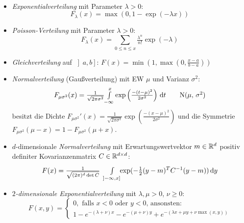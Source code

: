 \documentclass{cheat-sheet}
\begin{document}
\begin{defn}\mbox{}\\
  \begin{itemize}
    \item \emph{Exponentialverteilung} mit Parameter $\lambda > 0$:
    \[ F_{\lambda}(x) = \max(0, 1 - \exp(- \lambda x)) \tag*{Exp($\lambda$)} \]
    \item \emph{Poisson-Verteilung} mit Parameter $\lambda > 0$:
    \[ F_{\lambda}(x) = \sum_{0 \leq n \leq x} \tfrac{\lambda^n}{n!} \exp(-\lambda) \tag*{Poi($\lambda$)} \]
    \item \emph{Gleichverteilung} auf $\left] a, b \right]$: $F(x) = \min(1, \max(0, \tfrac{x - a}{b - a}))$
    \item \emph{Normalverteilung} (Gaußverteilung) mit EW $\mu$ und Varianz $\sigma^2$:
    \[ F_{\mu \sigma^2}(x) = \tfrac{1}{\sqrt{2 \pi \sigma^2}} {\textstyle \int\limits_{-\infty}^{x}} \exp\left(\tfrac{-(t-\mu)^2}{2 \sigma^2}\right) \,\mathrm{d} t \tag*{N($\mu$, $\sigma^2$)} \]
    besitzt die Dichte $F_{\mu \sigma^2}'(x) = \tfrac{1}{\sqrt{2 \pi \sigma^2}} \exp\left(\tfrac{-(x-\mu)^2}{2 \sigma^2}\right)$ und die Symmetrie $F_{\mu \sigma^2}(\mu{-}x) = 1 - F_{\mu \sigma^2}(\mu{+}x)$.
    \item $d$-dimensionale \emph{Normalverteilung} mit Erwartungswertvektor $m \in \mathbb{R}^d$ positiv definiter Kovarianzenmatrix $C \in \mathbb{R}^{d \times d}$:
    \[ F(x) = \tfrac{1}{\sqrt{(2 \pi)^d \det C}} \enspace {\textstyle \int\limits_{\left] -\infty, x \right]}^{}} \!\! \exp(- \tfrac{1}{2} (y-m)^T C^{-1} (y-m)) \,\mathrm{d} y \]
    \item \emph{$2$-dimensionale Exponentialverteilung} mit $\lambda, \mu > 0$, $\nu \geq 0$:
    \[ F(x, y) = \begin{cases} 0, \text{ falls $x < 0$ oder $y < 0$, ansonsten:} \\ 1 - e^{-(\lambda {+} \nu) x} - e^{-(\mu {+} \nu) y} + e^{-(\lambda x {+} \mu y {+} \nu \max(x, y))} \end{cases} \]
  \end{itemize}
\end{defn}
\end{document}
